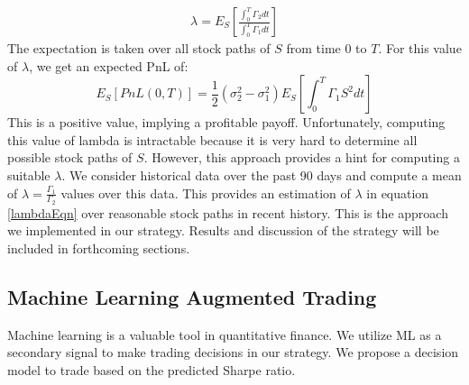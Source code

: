 \documentclass[10pt]{article}
\theoremstyle{definition}
\begin{document}
\begin{align}\label{lambdaEqn}
    \lambda = E_S \left[ \frac{\int_0^T \Gamma_2 d t}{\int_0^T \Gamma_1 d t}\right]
\end{align}
The expectation is taken over all stock paths of $S$ from time 0 to $T$. For this value of $\lambda$, we get an expected PnL of:
$$E_S[PnL(0,T)] = \frac12 (\sigma_2^2 - \sigma_1^2) E_S\left[\int_0^T \Gamma_1 S^2 d t\right]$$
This is a positive value, implying a profitable payoff. Unfortunately, computing this value of lambda is intractable because it is very hard to determine all possible stock paths of $S$. However, this approach provides a hint for computing a suitable $\lambda$. We consider historical data over the past 90 days and compute a mean of $\lambda = \frac{\Gamma_1}{\Gamma_2}$ values over this data. This provides an estimation of $\lambda$ in equation \ref{lambdaEqn} over reasonable stock paths in recent history. This is the approach we implemented in our strategy. Results and discussion of the strategy will be included in forthcoming sections.
 



\subsection{Machine Learning Augmented Trading} \label{rf}
Machine learning is a valuable tool in quantitative finance. We utilize ML as a secondary signal to make trading decisions in our strategy. We propose a decision model to trade based on the predicted Sharpe ratio. 
\end{document}
